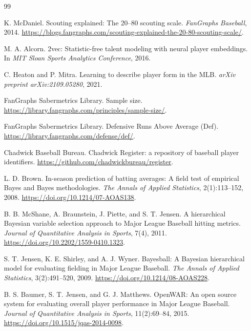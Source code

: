 \documentclass[10pt,twocolumn,letterpaper]{article}
\begin{document}
\begin{thebibliography}{99}

K. McDaniel.
\newblock Scouting explained: The 20--80 scouting scale.
\newblock \emph{FanGraphs Baseball}, 2014. \url{https://blogs.fangraphs.com/scouting-explained-the-20-80-scouting-scale/}.

M. A. Alcorn.
\newblock 2vec: Statistic-free talent modeling with neural player embeddings.
\newblock In \emph{MIT Sloan Sports Analytics Conference}, 2016.

C. Heaton and P. Mitra.
\newblock Learning to describe player form in the MLB.
\newblock \emph{arXiv preprint arXiv:2109.05280}, 2021.

FanGraphs Sabermetrics Library.
\newblock Sample size.
\newblock \url{https://library.fangraphs.com/principles/sample-size/}.

FanGraphs Sabermetrics Library.
\newblock Defensive Runs Above Average (Def).
\newblock \url{https://library.fangraphs.com/defense/def/}.

Chadwick Baseball Bureau.
\newblock Chadwick Register: a repository of baseball player identifiers.
\newblock \url{https://github.com/chadwickbureau/register}.

L. D. Brown.
\newblock In-season prediction of batting averages: A field test of empirical Bayes and Bayes methodologies.
\newblock \emph{The Annals of Applied Statistics}, 2(1):113--152, 2008. \url{https://doi.org/10.1214/07-AOAS138}.

B. B. McShane, A. Braunstein, J. Piette, and S. T. Jensen.
\newblock A hierarchical Bayesian variable selection approach to Major League Baseball hitting metrics.
\newblock \emph{Journal of Quantitative Analysis in Sports}, 7(4), 2011. \url{https://doi.org/10.2202/1559-0410.1323}.

S. T. Jensen, K. E. Shirley, and A. J. Wyner.
\newblock Bayesball: A Bayesian hierarchical model for evaluating fielding in Major League Baseball.
\newblock \emph{The Annals of Applied Statistics}, 3(2):491--520, 2009. \url{https://doi.org/10.1214/08-AOAS228}.

B. S. Baumer, S. T. Jensen, and G. J. Matthews.
\newblock OpenWAR: An open source system for evaluating overall player performance in Major League Baseball.
\newblock \emph{Journal of Quantitative Analysis in Sports}, 11(2):69--84, 2015. \url{https://doi.org/10.1515/jqas-2014-0098}.


\end{thebibliography}
\end{document}
